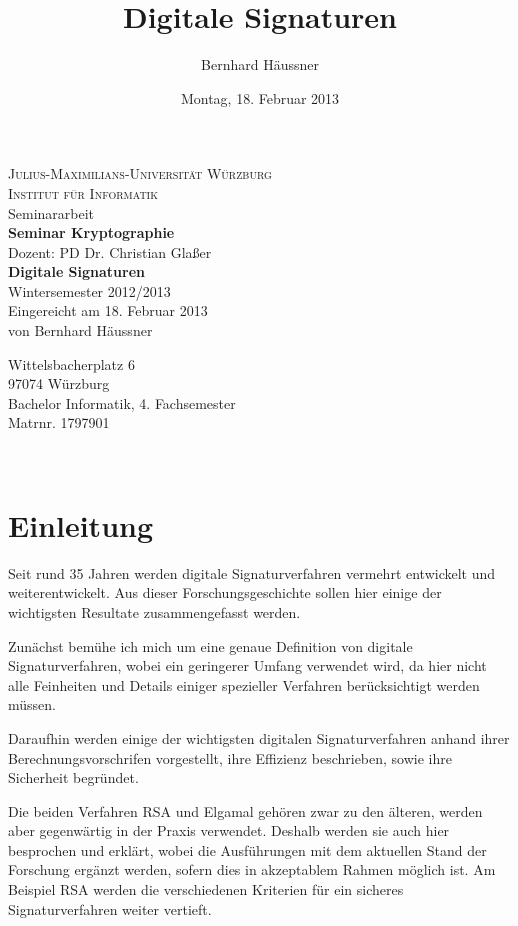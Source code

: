 \documentclass[a4paper,12pt,oneside]{scrreprt}
\title{Digitale Signaturen}
\author{Bernhard Häussner}
\date{Montag, 18. Februar 2013}
\begin{document}
\begin{titlepage}
\begin{center}
  \textsc{\LARGE Julius-Maximilians-Universität Würzburg}\\[0.5cm]
  \textsc{\Large Institut für Informatik}\\[5cm]
  Seminararbeit\\[0.3cm]
  {\Large \textbf{\sffamily Seminar Kryptographie}}\\[0.3cm]
  Dozent: PD Dr. Christian Glaßer\\[2cm]
  {\LARGE \textbf{\sffamily Digitale Signaturen}}\\[0.5cm]
  Wintersemester 2012/2013 \\[6cm]
  Eingereicht am 18. Februar 2013\\[0.3cm]
  von Bernhard Häussner\\[0.3cm]
  \begin{small}Wittelsbacherplatz 6\\
  97074 Würzburg\\[0.3cm]
  Bachelor Informatik, 4. Fachsemester\\
  Matrnr. 1797901\end{small}\\
\end{center}
\end{titlepage}

\renewcommand{\baselinestretch}{1.24} \normalsize

\tableofcontents




\chapter{Einleitung}

Seit rund 35 Jahren werden digitale Signaturverfahren vermehrt entwickelt und weiterentwickelt. Aus dieser Forschungsgeschichte sollen hier einige der wichtigsten Resultate zusammengefasst werden. 

Zunächst bemühe ich mich um eine genaue Definition von digitale Signaturverfahren, wobei ein geringerer Umfang verwendet wird, da hier nicht alle Feinheiten und Details einiger spezieller Verfahren berücksichtigt werden müssen. 

Daraufhin werden einige der wichtigsten digitalen Signaturverfahren anhand ihrer Berechnungsvorschrifen vorgestellt, ihre Effizienz beschrieben, sowie ihre Sicherheit begründet. 

Die beiden Verfahren RSA und Elgamal gehören zwar zu den älteren, werden aber gegenwärtig in der Praxis verwendet. Deshalb werden sie auch hier besprochen und erklärt, wobei die Ausführungen mit dem aktuellen Stand der Forschung ergänzt werden, sofern dies in akzeptablem Rahmen möglich ist. Am Beispiel RSA werden die verschiedenen Kriterien für ein sicheres Signaturverfahren weiter vertieft. 
\end{document}
